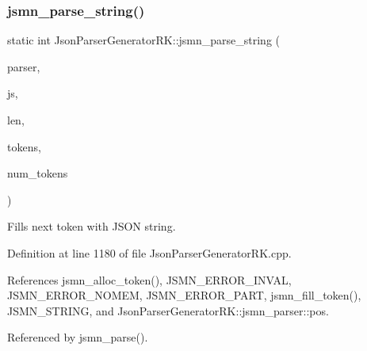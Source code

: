 \mbox{\label{namespace_json_parser_generator_r_k_a474570d80c95ff3722ae1e8e989c5999}} 
\subsubsection{jsmn\+\_\+parse\+\_\+string()}
{\footnotesize\ttfamily static int Json\+Parser\+Generator\+R\+K\+::jsmn\+\_\+parse\+\_\+string (\begin{DoxyParamCaption}\item[{\textbf{ jsmn\+\_\+parser} $\ast$}]{parser,  }\item[{const char $\ast$}]{js,  }\item[{size\+\_\+t}]{len,  }\item[{\textbf{ jsmntok\+\_\+t} $\ast$}]{tokens,  }\item[{size\+\_\+t}]{num\+\_\+tokens }\end{DoxyParamCaption})\hspace{0.3cm}{\ttfamily [static]}}

Fills next token with J\+S\+ON string. 

Definition at line 1180 of file Json\+Parser\+Generator\+R\+K.\+cpp.



References jsmn\+\_\+alloc\+\_\+token(), J\+S\+M\+N\+\_\+\+E\+R\+R\+O\+R\+\_\+\+I\+N\+V\+AL, J\+S\+M\+N\+\_\+\+E\+R\+R\+O\+R\+\_\+\+N\+O\+M\+EM, J\+S\+M\+N\+\_\+\+E\+R\+R\+O\+R\+\_\+\+P\+A\+RT, jsmn\+\_\+fill\+\_\+token(), J\+S\+M\+N\+\_\+\+S\+T\+R\+I\+NG, and Json\+Parser\+Generator\+R\+K\+::jsmn\+\_\+parser\+::pos.



Referenced by jsmn\+\_\+parse().


